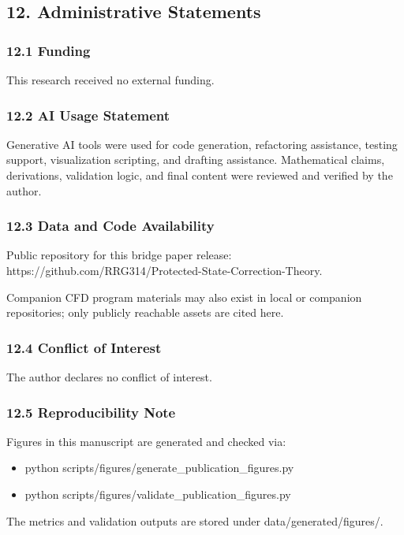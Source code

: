 \documentclass[11pt]{article}
\begin{document}
\subsection*{12. Administrative Statements}
\subsubsection*{12.1 Funding}
This research received no external funding.


\subsubsection*{12.2 AI Usage Statement}
Generative AI tools were used for code generation, refactoring assistance, testing support, visualization scripting, and drafting assistance. Mathematical claims, derivations, validation logic, and final content were reviewed and verified by the author.


\subsubsection*{12.3 Data and Code Availability}
Public repository for this bridge paper release: https://github.com/RRG314/Protected-State-Correction-Theory.

Companion CFD program materials may also exist in local or companion repositories; only publicly reachable assets are cited here.


\subsubsection*{12.4 Conflict of Interest}
The author declares no conflict of interest.


\subsubsection*{12.5 Reproducibility Note}
Figures in this manuscript are generated and checked via:

\begin{itemize}
\item python scripts/figures/generate\_publication\_figures.py
\item python scripts/figures/validate\_publication\_figures.py
\end{itemize}
The metrics and validation outputs are stored under data/generated/figures/.
\end{document}

